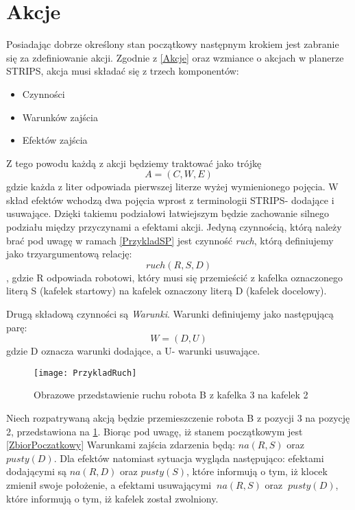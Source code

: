 \section{Akcje}
    Posiadając dobrze określony stan początkowy następnym krokiem jest zabranie się za zdefiniowanie akcji. Zgodnie z \ref{Akcje} oraz wzmiance o akcjach w planerze STRIPS,
    akcja musi składać się z trzech komponentów:
    \begin{itemize}
        \item Czynności
        \item Warunków zajścia
        \item Efektów zajścia
    \end{itemize}
    Z tego powodu każdą z akcji będziemy traktować jako trójkę 
    \begin{equation}
        A=(C,W,E)
    \end{equation}
    gdzie każda z liter odpowiada pierwszej literze wyżej wymienionego pojęcia. 
    W skład efektów wchodzą dwa pojęcia wprost z terminologii STRIPS- dodające i usuwające. Dzięki takiemu podziałowi łatwiejszym będzie 
    zachowanie silnego podziału między przyczynami a efektami akcji. 
    Jedyną czynnością, którą należy brać pod uwagę w ramach \ref{PrzykladSP} jest czynność \textit{ruch}, którą definiujemy jako trzyargumentową relację:
    \begin{equation}
        ruch(R,S,D)
    \end{equation}
    , gdzie R odpowiada robotowi, który musi się przemieścić z kafelka oznaczonego literą S (kafelek startowy) na kafelek oznaczony
    literą D (kafelek docelowy).
    
    Drugą składową czynności są \textit{Warunki}. Warunki definiujemy jako następującą parę:
    \begin{equation}
        W=(D,U)
    \end{equation}
    gdzie D oznacza warunki dodające, a U- warunki usuwające.
    \begin{figure}[H]
        \texttt{[image: PrzykladRuch]}
        \centering
        \caption{Obrazowe przedstawienie ruchu robota B z kafelka 3 na kafelek 2}
        \label{PrzykladRuch}
    \end{figure}
    Niech rozpatrywaną akcją będzie przemieszczenie robota B z pozycji 3 na pozycję 2,
    przedstawiona na \ref{PrzykladRuch}. Biorąc pod uwagę, iż stanem początkowym jest \ref{ZbiorPoczatkowy} Warunkami zajścia zdarzenia
    będą: $na(R,S)$ oraz $pusty(D)$. Dla efektów natomiast sytuacja wygląda następująco: efektami dodającymi są $na(R,D)$ oraz $pusty(S)$, które informują o tym, iż klocek 
    zmienił swoje położenie, a efektami usuwającymi $~na(R,S)$ oraz $~pusty(D)$, które informują o tym, iż kafelek został zwolniony.


